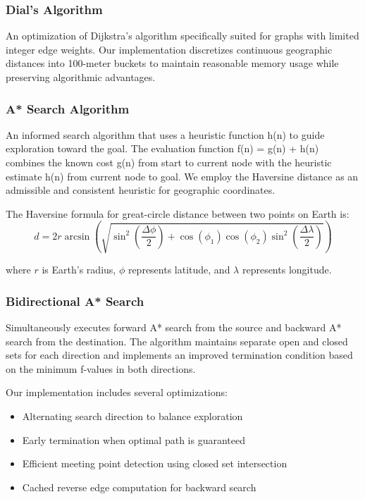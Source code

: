 \documentclass[conference]{IEEEtran}
\begin{document}
\subsubsection{Dial's Algorithm}
An optimization of Dijkstra's algorithm specifically suited for graphs with limited integer edge weights. Our implementation discretizes continuous geographic distances into 100-meter buckets to maintain reasonable memory usage while preserving algorithmic advantages.

\subsubsection{A* Search Algorithm}
An informed search algorithm that uses a heuristic function h(n) to guide exploration toward the goal. The evaluation function f(n) = g(n) + h(n) combines the known cost g(n) from start to current node with the heuristic estimate h(n) from current node to goal. We employ the Haversine distance as an admissible and consistent heuristic for geographic coordinates.

The Haversine formula for great-circle distance between two points on Earth is:
\begin{equation}
d = 2r \arcsin\left(\sqrt{\sin^2\left(\frac{\Delta\phi}{2}\right) + \cos(\phi_1)\cos(\phi_2)\sin^2\left(\frac{\Delta\lambda}{2}\right)}\right)
\end{equation}

where $r$ is Earth's radius, $\phi$ represents latitude, and $\lambda$ represents longitude.

\subsubsection{Bidirectional A* Search}
Simultaneously executes forward A* search from the source and backward A* search from the destination. The algorithm maintains separate open and closed sets for each direction and implements an improved termination condition based on the minimum f-values in both directions.

Our implementation includes several optimizations:
\begin{itemize}
\item Alternating search direction to balance exploration
\item Early termination when optimal path is guaranteed
\item Efficient meeting point detection using closed set intersection
\item Cached reverse edge computation for backward search
\end{itemize}
\end{document}
